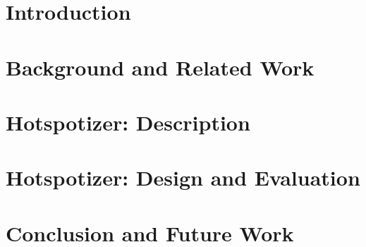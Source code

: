 \documentclass[10pt, twoside]{book}
\begin{document}
%
%
%
%
%

\setcounter{tocdepth}{1}
\tableofcontents

\mainmatter

\chapter{Introduction}
\label{chp:introduction}


\chapter{Background and Related Work}
\label{chp:background}


\chapter{Hotspotizer: Description}
\label{chp:hotspotizer}


\chapter{Hotspotizer: Design and Evaluation}
\label{chp:description}


\chapter{Conclusion and Future Work}
\label{chp:conclusion}


\printbibliography

\appendix

\end{document}
